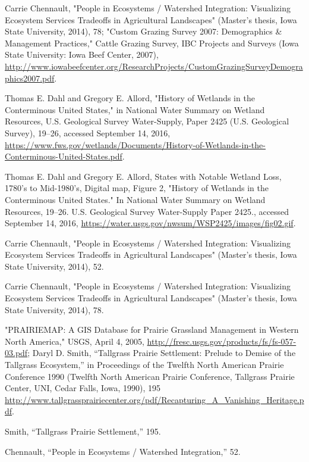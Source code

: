\documentclass[11pt]{article}
\begin{document}
\begin{thebibliography}{1}
  Carrie Chennault, "People in Ecosystems / Watershed Integration: Visualizing Ecosystem Services Tradeoffs in Agricultural Landscapes" (Master’s thesis, Iowa State University, 2014), 78; "Custom Grazing Survey 2007: Demographics \& Management Practices," Cattle Grazing Survey, IBC Projects and Surveys (Iowa State University: Iowa Beef Center, 2007), \url{http://www.iowabeefcenter.org/ResearchProjects/CustomGrazingSurveyDemographics2007.pdf}.
  
  
  Thomas E. Dahl and Gregory E. Allord, "History of Wetlands in the Conterminous United States," in National Water Summary on Wetland Resources, U.S. Geological Survey Water-Supply, Paper 2425 (U.S. Geological Survey), 19–26, accessed September 14, 2016, \url{https://www.fws.gov/wetlands/Documents/History-of-Wetlands-in-the-Conterminous-United-States.pdf}.
  
  Thomas E. Dahl and Gregory E. Allord, States with Notable Wetland Loss, 1780’s to Mid-1980’s, Digital map, Figure 2, "History of Wetlands in the Conterminous United States." In National Water Summary on Wetland Resources, 19–26. U.S. Geological Survey Water-Supply Paper 2425., accessed September 14, 2016, \url{https://water.usgs.gov/nwsum/WSP2425/images/fig02.gif}.
  
  Carrie Chennault, "People in Ecosystems / Watershed Integration: Visualizing Ecosystem Services Tradeoffs in Agricultural Landscapes" (Master’s thesis, Iowa State University, 2014), 52.
  
  Carrie Chennault, "People in Ecosystems / Watershed Integration: Visualizing Ecosystem Services Tradeoffs in Agricultural Landscapes" (Master’s thesis, Iowa State University, 2014), 78.
  
  "PRAIRIEMAP: A GIS Database for Prairie Grassland Management in Western North America," USGS, April 4, 2005, \url{http://fresc.usgs.gov/products/fs/fs-057-03.pdf}; Daryl D. Smith, “Tallgrass Prairie Settlement: Prelude to Demise of the Tallgrass Ecosystem,” in Proceedings of the Twelfth North American Prairie Conference 1990 (Twelfth North American Prairie Conference, Tallgrass Prairie Center, UNI, Cedar Falls, Iowa, 1990), 195 \url{http://www.tallgrassprairiecenter.org/pdf/Recapturing_A_Vanishing_Heritage.pdf}.
  
 Smith, “Tallgrass Prairie Settlement,” 195.
   
 Chennault, “People in Ecosystems / Watershed Integration,” 52.
   

\end{thebibliography}
\end{document}
